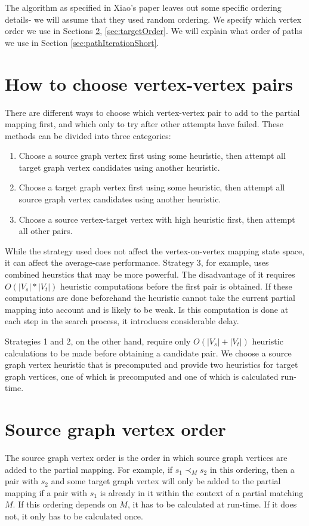The algorithm as specified in Xiao's paper leaves out some specific ordering details- we will assume that they used random ordering. We specify which vertex order we use in Sections \ref{sec:sourceOrder}, \ref{sec:targetOrder}. We will explain what order of paths we use in Section \ref{sec:pathIterationShort}.

\section{How to choose vertex-vertex pairs}
There are different ways to choose which vertex-vertex pair to add to the partial mapping first, and which only to try after other attempts have failed. These methods can be divided into three categories:

\begin{enumerate}
\item Choose a source graph vertex first using some heuristic, then attempt all target graph vertex candidates using another heuristic.
\item Choose a target graph vertex first using some heuristic, then attempt all source graph vertex candidates using another heuristic.
\item Choose a source vertex-target vertex with high heuristic first, then attempt all other pairs.
\end{enumerate}

While the strategy used does not affect the vertex-on-vertex mapping state space, it can affect the average-case performance. Strategy 3, for example, uses combined heurstics that may be more powerful. The disadvantage of it requires $O(|V_s|*|V_t|)$ heuristic computations before the first pair is obtained. If these computations are done beforehand the heuristic cannot take the current partial mapping into account and is likely to be weak. Is this computation is done at each step in the search process, it introduces considerable delay.

Strategies 1 and 2, on the other hand, require only $O(|V_s|+|V_t|)$ heuristic calculations to be made before obtaining a candidate pair. We choose a source graph vertex heuristic that is precomputed and provide two heuristics for target graph vertices, one of which is precomputed and one of which is calculated run-time.

\section{Source graph vertex order}
\label{sec:sourceOrder}
The source graph vertex order is the order in which source graph vertices are added to the partial mapping. For example, if $s_1 \prec_M s_2$ in this ordering, then a pair with $s_2$ and some target graph vertex will only be added to the partial mapping if a pair with $s_1$ is already in it within the context of a partial matching $M$. If this ordering depends on $M$, it has to be calculated at run-time. If it does not, it only has to be calculated once.

